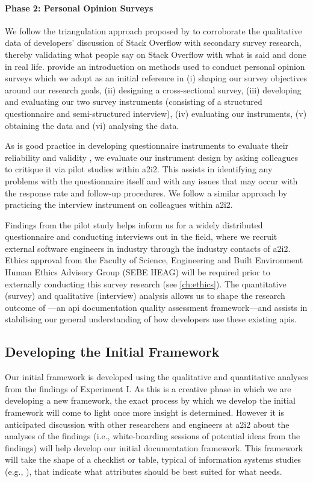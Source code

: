 \paragraph{Phase 2: Personal Opinion Surveys}
We follow the triangulation approach proposed by \citet{Jick:1979el} to corroborate the qualitative data of developers' discussion of Stack Overflow with secondary survey research, thereby validating what people say on Stack Overflow with what is said and done in real life. \citet{Kitchenham:2007ux} provide an introduction on methods used to conduct personal opinion surveys which we adopt as an initial reference in (i) shaping our survey objectives around our research goals, (ii) designing a cross-sectional survey, (iii) developing and evaluating our two survey instruments (consisting of a structured questionnaire and semi-structured interview), (iv) evaluating our instruments, (v) obtaining the data and (vi) analysing the data.

As is good practice in developing questionnaire instruments to evaluate their reliability and validity \citep{Litwin:1995wt}, we evaluate our instrument design by asking colleagues to critique it via pilot studies within \gls{a2i2}. This assists in identifying any problems with the questionnaire itself and with any issues that may occur with the response rate and follow-up procedures. We follow a similar approach by practicing the interview instrument on colleagues within \gls{a2i2}.

Findings from the pilot study helps inform us for a widely distributed questionnaire and conducting interviews out in the field, where we recruit external software engineers in industry through the industry contacts of \gls{a2i2}. Ethics approval from the Faculty of Science, Engineering and Built Environment Human Ethics Advisory Group (SEBE HEAG) will be required prior to externally conducting this survey research (see \cref{ch:ethics}). The quantitative (survey) and qualitative (interview) analysis allows us to shape the research outcome of ---an \gls{api} documentation quality assessment framework---and assists in stabilising our general understanding of how developers use these existing \glspl{api}.

\subsection{Developing the Initial Framework}

Our initial framework is developed using the qualitative and quantitative analyses from the findings of Experiment I. As this is a creative phase in which we are developing a new framework, the exact process by which we develop the initial framework will come to light once more insight is determined. However it is anticipated discussion with other researchers and engineers at \gls{a2i2} about the analyses of the findings (i.e., white-boarding sessions of potential ideas from the findings) will help develop our initial documentation framework. This framework will take the shape of a checklist or table, typical of information systems studies (e.g., \citep{Lau:1999vs}), that indicate what attributes should be best suited for what needs.


